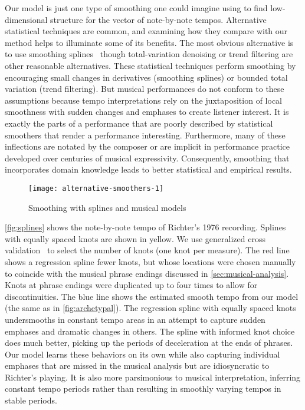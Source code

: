 \documentclass[12pt]{article}
\begin{document}
Our model is just one type of smoothing one could imagine using to
find low-dimensional structure for the vector of note-by-note
tempos. Alternative statistical techniques are common, and examining
how they compare with our method helps to illuminate some of its
benefits. The most obvious alternative is to use smoothing
splines~\citep{CravenWahba1978,Wahba1990} though total-variation
denoising or trend filtering \citep{KimKoh2009,Tibshirani2014} are
other reasonable alternatives.
These statistical techniques perform smoothing by encouraging small
changes in derivatives (smoothing splines) or bounded total variation
(trend filtering). 
But musical performances do not conform to these assumptions because tempo interpretations rely on the juxtaposition of local smoothness
with sudden changes and emphases to create listener interest. It is
exactly the parts of a performance that are poorly described by
statistical smoothers that render a performance
interesting. Furthermore, many of these
inflections are notated by the 
composer or are implicit in performance practice developed over
centuries of musical expressivity. Consequently, smoothing that
incorporates domain knowledge leads to better statistical and
empirical results.
\begin{figure}[t]
  \centering
  \texttt{[image: alternative-smoothers-1]}
  \caption{Smoothing with splines and musical models}
  \label{fig:splines}
\end{figure}

\autoref{fig:splines}
shows the note-by-note tempo of Richter's 1976 recording. Splines with
equally spaced knots are shown in yellow. We use generalized cross
validation~\citep{GolubHeath1979} to select the number of knots (one
knot per measure). The red line shows a regression spline fewer knots,
but whose locations were chosen
manually
to coincide with the musical phrase endings discussed in
\autoref{sec:musical-analysis}. Knots at phrase endings were
duplicated up to four times to allow for discontinuities. The blue line 
shows the estimated smooth tempo from our model (the same as in
\autoref{fig:archetypal}). The regression spline with
equally spaced knots undersmooths in constant tempo areas in an
attempt to capture sudden emphases and dramatic changes in others. The spline
with informed knot choice does much better, picking up the periods of
deceleration at the ends of phrases. Our model learns these behaviors
on its own while also capturing individual emphases that are missed in
the musical analysis but are idiosyncratic to Richter's playing. It is
also more parsimonious to musical interpretation, inferring constant
tempo periods rather than resulting in smoothly varying tempos in
stable periods.%
\end{document}
